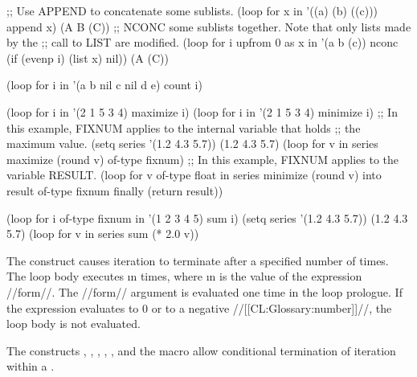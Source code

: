 
\code ;; Use APPEND to concatenate some sublists.
  (loop for x in '((a) (b) ((c)))
        append x) \EV (A B (C))
  ;; NCONC some sublists together.  Note that only lists made by the ;; call to LIST are modified.
  (loop for i upfrom 0 
        as x in '(a b (c))
        nconc (if (evenp i) (list x) nil)) \EV (A (C)) \endcode

\endsubsubsection%


\code
 (loop for i in '(a b nil c nil d e)
       count i)  \endcode
  \endsubsubsection%


\code
 (loop for i in '(2 1 5 3 4)
       maximize i) 
 (loop for i in '(2 1 5 3 4)
       minimize i) 
  ;; In this example, FIXNUM applies to the internal variable that holds ;; the maximum value.
 (setq series '(1.2 4.3 5.7)) \EV (1.2 4.3 5.7)
 (loop for v in series 
       maximize (round v) of-type fixnum) 
  ;; In this example, FIXNUM applies to the variable RESULT.
 (loop for v of-type float in series
       minimize (round v) into result of-type fixnum
       finally (return result))  \endcode

\endsubsubsection%


\code
 (loop for i of-type fixnum in '(1 2 3 4 5)
       sum i) 
 (setq series '(1.2 4.3 5.7)) \EV (1.2 4.3 5.7)
 (loop for v in series 
       sum (* 2.0 v))  \endcode

\endsubsubsection%

\endsubsection%

 

The  construct causes iteration to terminate after a specified number of times.
 The loop body executes \i{n} times, where \i{n} is the value  of the expression //form//.  The //form// argument is evaluated one time in the loop prologue.  If the expression evaluates to 0 or  to a negative //[[CL:Glossary:number]]//, the loop body is not evaluated.

The constructs , , , , , and the macro  allow conditional termination of iteration within a .

